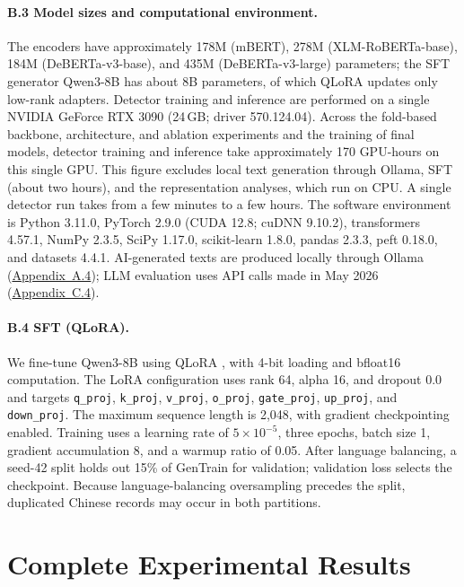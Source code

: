 \paragraph{B.3 Model sizes and computational environment.} The encoders have approximately 178M (mBERT), 278M (XLM-RoBERTa-base), 184M (DeBERTa-v3-base), and 435M (DeBERTa-v3-large) parameters; the SFT generator Qwen3-8B has about 8B parameters, of which QLoRA updates only low-rank adapters. Detector training and inference are performed on a single NVIDIA GeForce RTX 3090 (24\,GB; driver 570.124.04). Across the fold-based backbone, architecture, and ablation experiments and the training of final models, detector training and inference take approximately 170 GPU-hours on this single GPU. This figure excludes local text generation through Ollama, SFT (about two hours), and the representation analyses, which run on CPU. A single detector run takes from a few minutes to a few hours. The software environment is Python 3.11.0, PyTorch 2.9.0 (CUDA 12.8; cuDNN 9.10.2), transformers 4.57.1, NumPy 2.3.5, SciPy 1.17.0, scikit-learn 1.8.0, pandas 2.3.3, peft 0.18.0, and datasets 4.4.1. AI-generated texts are produced locally through Ollama (\hyperref[app:a4]{Appendix~A.4}); LLM evaluation uses API calls made in May 2026 (\hyperref[app:c4]{Appendix~C.4}).

\paragraph{B.4 SFT (QLoRA).} We fine-tune Qwen3-8B using QLoRA \citep{dettmers2023qlora}, with 4-bit loading and bfloat16 computation. The LoRA configuration \citep{hu2022lora} uses rank 64, alpha 16, and dropout 0.0 and targets \texttt{q\_proj}, \texttt{k\_proj}, \texttt{v\_proj}, \texttt{o\_proj}, \texttt{gate\_proj}, \texttt{up\_proj}, and \texttt{down\_proj}. The maximum sequence length is 2{,}048, with gradient checkpointing enabled. Training uses a learning rate of $5\times10^{-5}$, three epochs, batch size 1, gradient accumulation 8, and a warmup ratio of 0.05. After language balancing, a seed-42 split holds out 15\% of GenTrain for validation; validation loss selects the checkpoint. Because language-balancing oversampling precedes the split, duplicated Chinese records may occur in both partitions.

\section{Complete Experimental Results}
\label{app:results}

